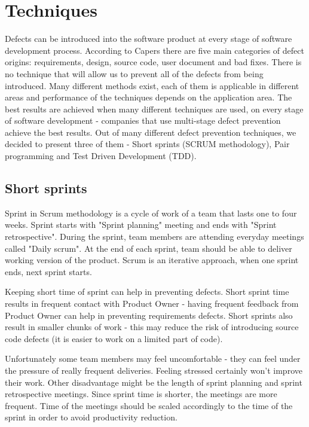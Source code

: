 \section{Techniques}
Defects can be introduced into the software product at every stage of software development process. According to Capers\cite{capers} there are five main categories of defect origins: requirements, design, source code, user document and bad fixes. There is no technique that will allow us to prevent all of the defects from being introduced. Many different methods exist, each of them is applicable in different areas and performance of the techniques depends on the application area. The best results are achieved when many different techniques are used, on every stage of software development - companies that use multi-stage defect prevention achieve the best results\cite{capers}. Out of many different defect prevention techniques, we decided to present three of them - Short sprints (SCRUM methodology), Pair programming and Test Driven Development (TDD).
 
\subsection{Short sprints}
Sprint in Scrum methodology is a cycle of work of a team that lasts one to four weeks. Sprint starts with "Sprint planning" meeting and ends with "Sprint retrospective". During the sprint, team members are attending everyday meetings called "Daily scrum". At the end of each sprint, team should be able to deliver working version of the product. Scrum is an iterative approach, when one sprint ends, next sprint starts.

Keeping short time of sprint can help in preventing defects. Short sprint time results in frequent contact with Product Owner - having frequent feedback from Product Owner can help in preventing requirements defects. Short sprints also result in smaller chunks of work - this may reduce the risk of introducing source code defects (it is easier to work on a limited part of code).   

Unfortunately some team members may feel uncomfortable - they can feel under the pressure of really frequent deliveries. Feeling stressed certainly won't improve their work. Other disadvantage might be the length of sprint planning and sprint retrospective meetings. Since sprint time is shorter, the meetings are more frequent. Time of the meetings should be scaled accordingly to the time of the sprint in order to avoid productivity reduction.

